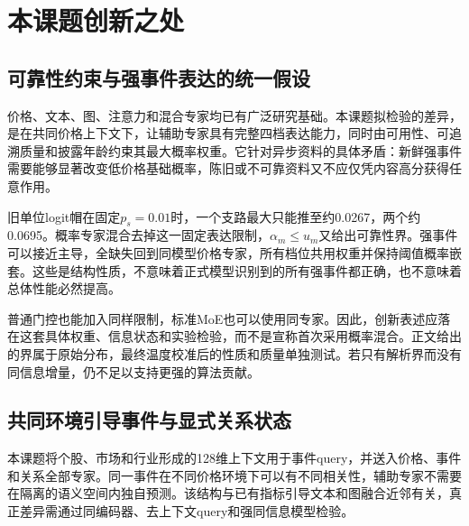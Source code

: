 \chapter{本课题创新之处}
\section{可靠性约束与强事件表达的统一假设}
价格、文本、图、注意力和混合专家均已有广泛研究基础。本课题拟检验的差异，是在共同价格上下文下，让辅助专家具有完整四档表达能力，同时由可用性、可追溯质量和披露年龄约束其最大概率权重。它针对异步资料的具体矛盾：新鲜强事件需要能够显著改变低价格基础概率，陈旧或不可靠资料又不应仅凭内容高分获得任意作用。

旧单位logit帽在固定$p_s=0.01$时，一个支路最大只能推至约0.0267，两个约0.0695。概率专家混合去掉这一固定表达限制，$\alpha_m\le u_m$又给出可靠性界。强事件可以接近主导，全缺失回到同模型价格专家，所有档位共用权重并保持阈值概率嵌套。这些是结构性质，不意味着正式模型识别到的所有强事件都正确，也不意味着总体性能必然提高。


普通门控也能加入同样限制，标准MoE也可以使用同专家。因此，创新表述应落在这套具体权重、信息状态和实验检验，而不是宣称首次采用概率混合。正文给出的界属于原始分布，最终温度校准后的性质和质量单独测试。若只有解析界而没有同信息增量，仍不足以支持更强的算法贡献。

\section{共同环境引导事件与显式关系状态}
本课题将个股、市场和行业形成的128维上下文用于事件query，并送入价格、事件和关系全部专家。同一事件在不同价格环境下可以有不同相关性，辅助专家不需要在隔离的语义空间内独自预测。该结构与已有指标引导文本和图融合近邻有关，真正差异需通过同编码器、去上下文query和强同信息模型检验。

